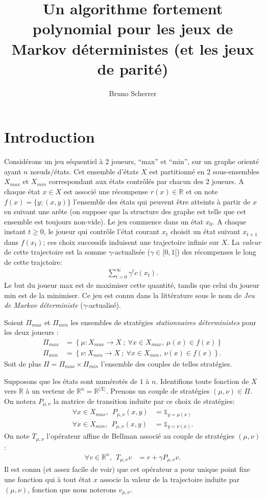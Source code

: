 \documentclass{article}
\title{Un algorithme fortement polynomial pour les jeux de Markov déterministes (et les jeux de parité)}
\author{Bruno Scherrer}
\def\1{{\mathds 1}}
\def\R{\mathbb R}
\newcommand{\suc}[1]{f(#1)}
\begin{document}
\maketitle


\section{Introduction}

Considérons un jeu séquentiel à 2 joueurs, ``max'' et ``min'', sur un graphe orienté ayant $n$ n{\oe}uds/états. Cet ensemble d'états $X$ est partitionné en 2 sous-ensembles $X_{max}$ et $X_{min}$ correspondant aux états contrôlés par chacun des 2 joueurs. A chaque état $x \in X$ est associé une récompense $r(x) \in \R$ et on note $\suc{x}=\{y;(x,y)\}$ l'ensemble des états qui peuvent être atteints à partir de $x$ en suivant une arête (on suppose que la structure des graphe est telle que cet ensemble est toujours non-vide). Le jeu commence dans un état $x_0$. A chaque instant $t \ge 0$, le joueur qui contrôle l'état courant $x_t$ choisit un état suivant $x_{t+1}$ dans $\suc{x_t}$; ces choix successifs induisent une trajectoire infinie sur $X$. La \emph{valeur} de cette trajectoire est la somme $\gamma$-actualisée ($\gamma \in [0,1[$) des récompenses le long de cette trajctoire:
\begin{align}
\sum_{t=0}^{\infty} \gamma^t c(x_t).
\end{align}
Le but du joueur max est de maximiser cette quantité, tandis que celui du joueur min est de la minimiser. Ce jeu est connu dans la littérature sous le nom de \emph{Jeu de Markov déterministe} ($\gamma$-actualisé).

Soient $\Pi_{max}$ et $\Pi_{min}$ les ensembles de stratégies \emph{stationnaires déterministes} pour les deux joueurs :
\begin{align}
  \Pi_{max} & = \left\{ \mu:X_{max} \to X ~;~ \forall x \in X_{max},~ \mu(x) \in \suc{x} \right\}\\
  \Pi_{min} & = \left\{ \nu:X_{min} \to X ~;~ \forall x \in X_{min},~ \nu(x) \in \suc{x} \right\}.
\end{align}
Soit de plus $\Pi=\Pi_{max}\times \Pi_{min}$ l'ensemble des couples de telles stratégies.

Supposons que les états sont numérotés de $1$ à $n$. Identifions toute fonction de $X$ vers $\R$ à un vecteur de $\R^n=\R^{|X|}$. Prenons un couple de stratégies $(\mu,\nu) \in \Pi$. On notera $P_{\mu,\nu}$ la matrice de transition induite par ce choix de stratégies:
\begin{align}
  \forall x \in X_{max},~~  P_{\mu,\nu}(x,y) &= \1_{y=\mu(x)} \\
  \forall x \in X_{min},~~  P_{\mu,\nu}(x,y) &= \1_{y=\nu(x)}. 
\end{align}
On note $T_{\mu,\nu}$ l'opérateur affine de Bellman associé au couple de stratégies $(\mu,\nu)$:
\begin{align}
\forall v \in \R^n,~~  T_{\mu,\nu} v & = r + \gamma P_{\mu,\nu} v.
\end{align}
Il est connu (et assez facile de voir) que cet opérateur a pour unique point fixe une fonction qui à tout état $x$ associe la valeur de la trajectoire induite par $(\mu,\nu)$, fonction que nous noterons $v_{\mu,\nu}$. 
\end{document}
